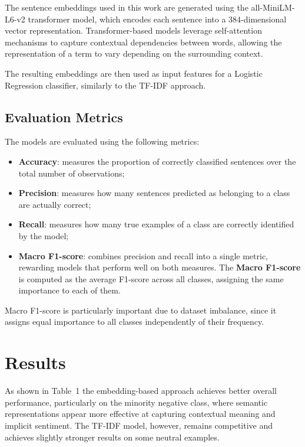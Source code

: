 \documentclass[11pt]{article}
\begin{document}
    The sentence embeddings used in this work are generated using the all-MiniLM-L6-v2 transformer model, which encodes each sentence into a 384-dimensional vector representation. Transformer-based models leverage self-attention mechanisms to capture contextual dependencies between words, allowing the representation of a term to vary depending on the surrounding context.

    The resulting embeddings are then used as input features for a Logistic Regression classifier, similarly to the TF-IDF approach.


    \subsection{Evaluation Metrics}

    The models are evaluated using the following metrics:
    \begin{itemize}
        \item \textbf{Accuracy}: measures the proportion of correctly classified sentences over the total number of observations;
        \item \textbf{Precision}: measures how many sentences predicted as belonging to a class are actually correct;
        \item \textbf{Recall}: measures how many true examples of a class are correctly identified by the model;
        \item \textbf{Macro F1-score}: combines precision and recall into a single metric, rewarding models that perform well on both measures. The \textbf{Macro F1-score} is computed as the average F1-score across all classes, assigning the same importance to each of them.
    \end{itemize}

    Macro F1-score is particularly important due to dataset imbalance, since it assigns equal importance to all classes independently of their frequency.


    \section{Results}

    As shown in Table~1 the embedding-based approach achieves better overall performance, particularly on the minority negative class, where semantic representations appear more effective at capturing contextual meaning and implicit sentiment. The TF-IDF model, however, remains competitive and achieves slightly stronger results on some neutral examples.
\end{document}
